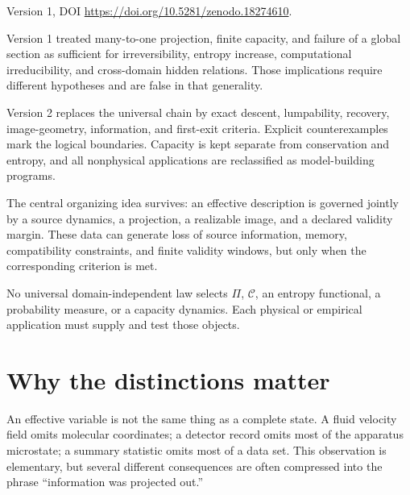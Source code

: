 \documentclass[11pt]{article}
\newcommand{\Ccap}{\mathcal C}
\begin{document}
\begin{description}[style=nextline]
\item[Supersedes.]
Version 1, DOI \url{https://doi.org/10.5281/zenodo.18274610}.
\item[Reason.]
Version 1 treated many-to-one projection, finite capacity, and failure of a
global section as sufficient for irreversibility, entropy increase,
computational irreducibility, and cross-domain hidden relations.  Those
implications require different hypotheses and are false in that generality.
\item[Resolution.]
Version 2 replaces the universal chain by exact descent, lumpability,
recovery, image-geometry, information, and first-exit criteria.  Explicit
counterexamples mark the logical boundaries.  Capacity is kept separate
from conservation and entropy, and all nonphysical applications are
reclassified as model-building programs.
\item[Retained content.]
The central organizing idea survives: an effective description is governed
jointly by a source dynamics, a projection, a realizable image, and a
declared validity margin.  These data can generate loss of source
information, memory, compatibility constraints, and finite validity
windows, but only when the corresponding criterion is met.
\item[Open boundary.]
No universal domain-independent law selects $\Pi$, $\Ccap$, an entropy
functional, a probability measure, or a capacity dynamics.  Each physical
or empirical application must supply and test those objects.
\end{description}

\tableofcontents

\section{Why the distinctions matter}

An effective variable is not the same thing as a complete state.  A fluid
velocity field omits molecular coordinates; a detector record omits most of
the apparatus microstate; a summary statistic omits most of a data set.
This observation is elementary, but several different consequences are
often compressed into the phrase ``information was projected out.''
\end{document}
